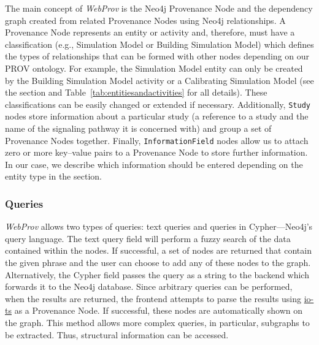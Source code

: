 \documentclass[10pt,letterpaper]{article}
\newcommand{\webprov}{\textit{WebProv}}
\newcommand{\provnode}{Provenance Node}
\newcommand{\provnodes}{Provenance Nodes}
\newcommand{\SM}{Simulation Model}
\newcommand{\BSM}{Building Simulation Model}
\newcommand{\CSM}{Calibrating Simulation Model}
\begin{document}
The main concept of \webprov{} is the Neo4j \provnode{} and the dependency graph created from related \provnodes{} using Neo4j relationships.
A \provnode{} represents an entity or activity and, therefore, must have a classification (e.g., \SM{} or \BSM{}) which defines the types of relationships that can be formed with other nodes depending on our PROV ontology.
For example, the \SM{} entity can only be created by the \BSM{} activity or a \CSM{} (see the  section and Table~\ref{tab:entitiesandactivities} for all details).
These classifications can be easily changed or extended if necessary.
Additionally, \texttt{Study} nodes store information about a particular study (a reference to a study and the name of the signaling pathway it is concerned with) and group a set of \provnodes{} together.
Finally, \texttt{InformationField} nodes allow us to attach zero or more key--value pairs to a \provnode{} to store further information.
In our case, we describe which information should be entered depending on the entity type in the  section.



\subsubsection*{Queries}

\webprov{} allows two types of queries: text queries and queries in Cypher---Neo4j's query language.
The text query field will perform a fuzzy search of the data contained within the nodes.
If successful, a set of nodes are returned that contain the given phrase and the user can choose to add any of these nodes to the graph.
Alternatively, the Cypher field passes the query as a string to the backend which forwards it to the Neo4j database.
Since arbitrary queries can be performed, when the results are returned, the frontend attempts to parse the results using \href{https://github.com/gcanti/io-ts}{io-ts} as a \provnode{}.
If successful, these nodes are automatically shown on the graph.
This method allows more complex queries, in particular, subgraphs to be extracted.
Thus, structural information can be accessed.



\end{document}
